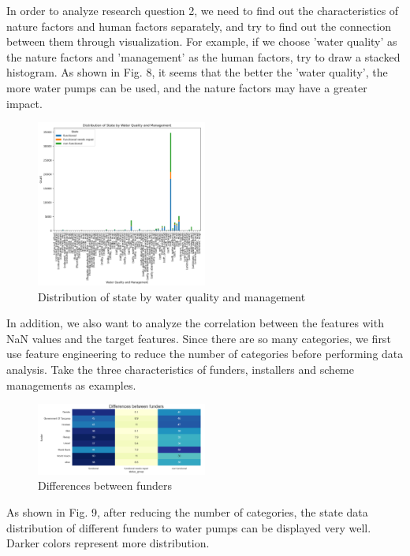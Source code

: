 \documentclass[conference]{IEEEtran}
\begin{document}
In order to analyze research question 2, we need to find out the characteristics of nature factors and human factors separately, and try to find out the connection between them through visualization. For example, if we choose 'water quality' as the nature factors and 'management' as the human factors, try to draw a stacked histogram. As shown in Fig. 8, it seems that the better the 'water quality', the more water pumps can be used, and the nature factors may have a greater impact.

\begin{figure}[H]
\centerline{\includegraphics[width=0.5\textwidth]{10.pic.jpg}}
\caption{Distribution of state by water quality and management}
\end{figure}
    
In addition, we also want to analyze the correlation between the features with NaN values and the target features. Since there are so many categories, we first use feature engineering to reduce the number of categories before performing data analysis. Take the three characteristics of funders, installers and scheme managements as examples.

\begin{figure}[H]
\centerline{\includegraphics[width=0.5\textwidth]{7.pic.jpg}}
\caption{Differences between funders}
\end{figure}

As shown in Fig. 9, after reducing the number of categories, the state data distribution of different funders to water pumps can be displayed very well. Darker colors represent more distribution.
\end{document}
